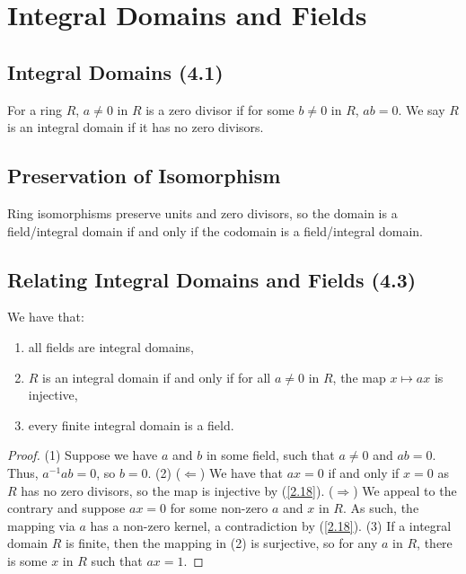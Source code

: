 \section{Integral Domains and Fields}

\subsection{Integral Domains (4.1)} \label{4.1}

For a ring $R$, $a \neq 0$ in $R$ is a zero divisor if for some 
$b \neq 0$ in $R$, $ab = 0$. We say $R$ is an integral domain if it has
no zero divisors.

\subsection{Preservation of Isomorphism}

Ring isomorphisms preserve units and zero divisors, 
so the domain is a field/integral domain if and only 
if the codomain is a field/integral domain.

\subsection{Relating Integral Domains and Fields (4.3)} \label{4.3}

We have that: \begin{enumerate}
    \item all fields are integral domains,
    \item $R$ is an integral domain if and only if for all
        $a \neq 0$ in $R$, the map $x \mapsto ax$ is injective,
    \item every finite integral domain is a field. 
\end{enumerate}

\begin{proof}
    (1) Suppose we have $a$ and $b$ in some field, such that
    $a \neq 0$ and $ab = 0$. Thus, $a^{-1}ab = 0$, so
    $b = 0$. 
    \bs
    (2) ($\Longleftarrow$) We have that $ax = 0$ if and only if
    $x = 0$ as $R$ has no zero divisors, so the map is 
    injective by (\ref{2.18}). \newline
    ($\Longrightarrow$) We appeal to the contrary and suppose
    $ax = 0$ for some non-zero $a$ and $x$ in $R$. As such,
    the mapping via $a$ has a non-zero kernel, a contradiction
    by (\ref{2.18}).
    \bs
    (3) If a integral domain $R$ is finite, then the mapping 
    in (2) is surjective, so for any $a$ in $R$, there is
    some $x$ in $R$ such that $ax = 1$.
\end{proof}

